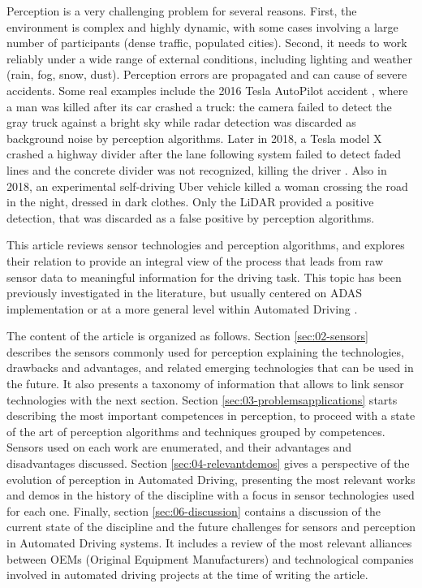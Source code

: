 Perception is a very challenging problem for several
reasons. First, the environment is complex and highly dynamic, with some cases
involving a large number of participants (dense traffic, populated cities). 
Second, it needs to work reliably under a wide range of external conditions, 
including lighting and weather (rain, fog, snow, dust). 
Perception errors are propagated and can cause of severe accidents. 
Some real examples include the 2016 Tesla AutoPilot accident \cite{NTSB2017},
where a man was killed after its car crashed a truck: 
the camera failed to detect the gray truck against a bright sky while radar
detection was discarded as background noise by perception algorithms.
Later in 2018, a Tesla model X crashed a highway divider after the lane
following system failed to detect faded lines and the concrete divider was not
recognized, killing the driver \cite{NTSB2018a}.
Also in 2018, an experimental self-driving Uber vehicle killed a woman
crossing the road \cite{NTSB2018} in the night, dressed in dark clothes. 
Only the LiDAR provided a positive detection, that was discarded as a false
positive by perception algorithms.

This article reviews sensor technologies and perception algorithms, and explores
their relation to provide an integral view of the process that leads from raw
sensor data to meaningful information for the driving task.
This topic has been previously investigated in the literature, but usually
centered on ADAS implementation \cite{Yenkanchi2016,Ziebinski2016a} or at a
more general level within Automated Driving \cite{Pendleton2017}. 

The content of the article is organized as follows. Section 
\ref{sec:02-sensors} describes the sensors commonly used for perception 
explaining the technologies, drawbacks and advantages, and related emerging 
technologies that can be used in the future. It also presents a 
taxonomy of information that allows to link sensor technologies with the 
next section.
Section \ref{sec:03-problemsapplications} starts describing the most important 
competences in perception, to proceed with a state of the art of perception 
algorithms and techniques grouped by competences. Sensors used on each work
are enumerated, and their advantages and disadvantages discussed. 
Section \ref{sec:04-relevantdemos} gives a perspective of the evolution of
perception in Automated Driving, presenting the most relevant works and demos
in the history of the discipline with a focus in sensor technologies used for
each one. 
Finally, section \ref{sec:06-discussion} contains a discussion of the current
state of the discipline and the future challenges for sensors and perception in
Automated Driving systems. It includes a review of the most relevant alliances 
between OEMs (Original Equipment Manufacturers) and technological companies
involved in automated driving projects at the time of writing the article.
